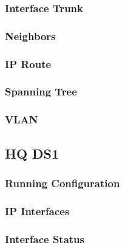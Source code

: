 \subsubsection{Interface Trunk}


\subsubsection{Neighbors}


\subsubsection{IP Route}


\subsubsection{Spanning Tree}


\subsubsection{VLAN}






\subsection{HQ DS1}
\subsubsection{Running Configuration}


\subsubsection{IP Interfaces}


\subsubsection{Interface Status}



